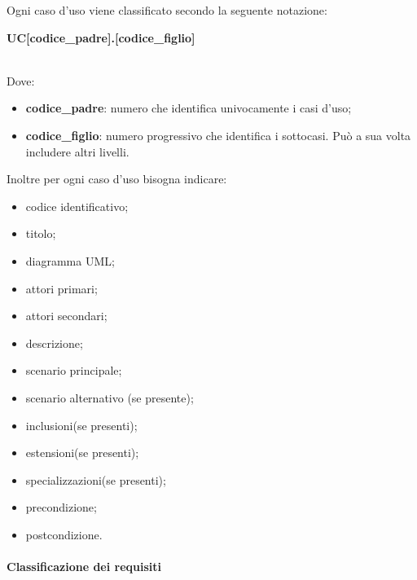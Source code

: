 \noindent Ogni caso d'uso viene classificato secondo la seguente notazione: \newline \newline
\centerline{\textbf{UC[codice\_padre].[codice\_figlio]}} \\
Dove:
	\begin{itemize}
		\item \textbf{codice\_padre}: numero che identifica univocamente i casi 
			d'uso;
		\item \textbf{codice\_figlio}: numero progressivo che identifica i 
			sottocasi. Può a sua volta includere altri livelli. \\
	\end{itemize}
Inoltre per ogni caso d'uso bisogna indicare:
	\begin{itemize}
		\item codice identificativo;
		\item titolo;
		\item diagramma UML\glo;
		\item attori primari;
		\item attori secondari;
		\item descrizione;
		\item scenario principale;
		\item scenario alternativo (se presente);
		\item inclusioni(se presenti);
		\item estensioni(se presenti);
		\item specializzazioni(se presenti);
		\item precondizione;
		\item postcondizione. \\
	\end{itemize}


\paragraph*{Classificazione dei requisiti} \mbox{}\\ \label{sec:UC}

